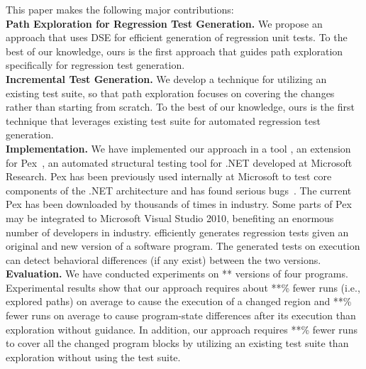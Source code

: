 This paper makes the following major contributions:
\\ \textbf{Path Exploration for Regression Test Generation.} We propose an approach that uses DSE for efficient generation of regression unit tests. To the best
of our knowledge, ours is the first approach that guides path exploration specifically for regression test generation.
\\ \textbf{Incremental Test Generation.} We develop a technique for utilizing an existing test suite, so that path exploration focuses on covering the changes rather than starting from scratch. To the best of our knowledge, ours is the first technique that leverages existing test suite for automated regression test generation.
\\ \textbf{Implementation.} We have implemented our approach in a tool , an extension for Pex~\cite{Pex},  an automated structural testing tool for .NET developed at Microsoft Research. Pex has been previously used internally at Microsoft to test core components of the .NET architecture and has found serious
bugs~\cite{Pex}. The current Pex has been downloaded by thousands of times in industry. Some parts of Pex may be integrated to Microsoft Visual Studio 2010, benefiting an enormous number of developers in industry.  efficiently generates regression tests given an original and new version of a software program. The generated tests on execution can detect behavioral differences (if any exist) between the two versions. 
\\ \textbf{Evaluation.} We have conducted experiments on ** versions of four programs. Experimental results show that our approach requires about **\% fewer runs (i.e., explored paths) on average  to cause the execution of a changed region and **\% fewer runs on average to cause program-state differences after its execution than exploration without guidance. In addition, our approach requires **\% fewer runs to cover all the changed program blocks by utilizing an existing test suite than exploration without using the test suite. 
